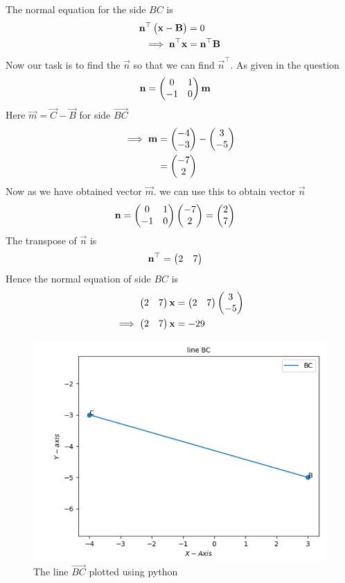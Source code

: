\documentclass[11pt]{book}
\begin{document}
\begin{enumerate}[label=\thesection.\arabic*.,ref=\thesection.\theenumi]
       The normal equation for the side $BC$ is
\begin{align}
\mathbf{n}^{\top}\begin{pmatrix}\mathbf{x}-\mathbf{B}\end{pmatrix}&=0\\
\implies
\mathbf{n}^{\top}\mathbf{x}&=\mathbf{n}^{\top}\mathbf{B}
\end{align}
Now our task is to find the $\vec{n}$ so that we can find $\vec{n}^{\top}$.
As given in the question 
\begin{align}
  \mathbf{n} &= \begin{pmatrix}0 & 1\\
  -1 & 0\end{pmatrix}\mathbf{m}
\end{align}
Here $\vec{m} = \vec{C}- \vec{B}$ for side $\vec{BC}$
\begin{align}
\implies
\mathbf{m}&=\begin{pmatrix}-4\\-3\end{pmatrix} - \begin{pmatrix}3\\-5\end{pmatrix}\\
&=\begin{pmatrix}-7\\2\end{pmatrix}
\end{align}
Now as we have obtained vector $\vec{m}$.
we can use this to obtain vector $\vec{n}$
\begin{align}
\mathbf{n} &= \begin{pmatrix}0 & 1\\
  -1 & 0\end{pmatrix}\begin{pmatrix}-7\\2\end{pmatrix}
 = \begin{pmatrix}2\\7\end{pmatrix}
\end{align}
The transpose of $\vec{n}$ is
\begin{align}
  \mathbf{n}^{\top}&=\begin{pmatrix}2 & 7\end{pmatrix}
\end{align}
Hence the normal equation of side $BC$ is 
\begin{align}
    \begin{pmatrix}2 & 7\end{pmatrix}\mathbf{x}&=\begin{pmatrix}2 & 7\end{pmatrix}\begin{pmatrix}3\\-5\end{pmatrix}\\
    \implies
    \begin{pmatrix}2 & 7\end{pmatrix}\mathbf{x}&=-29
\end{align}
\begin{figure}
\includegraphics [width=\columnwidth] {figs/linebc.png}
\caption{ The line $\vec{BC}$ plotted using python}
\label{fig: linebc}
\end{figure}




\end{enumerate}
\end{document}
